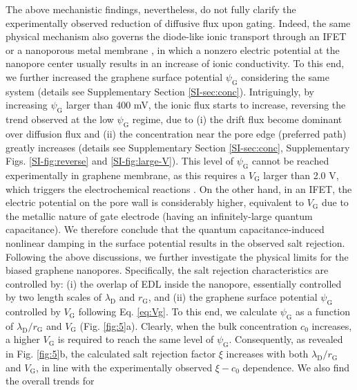 \documentclass[journal=nalefd,email=true, hyperref=true, keywords=false]{achemso}
\newcommand{\Fig}{Fig.}
\begin{document}
The above mechanistic findings, nevertheless, do not fully clarify the
experimentally observed reduction of diffusive flux upon
gating. Indeed, the same physical mechanism also governs 
the 
{ diode-like ionic
transport through an IFET  \cite{Nam_2009,Lee_2015,Feng_2016}
or a nanoporous metal membrane \cite{mccurry2017electrolyte}},
in which a nonzero electric potential at
the nanopore center usually results in an increase of ionic
conductivity. To this end, we
further increased the graphene surface potential $\psi_{\mathrm{G}}$
considering the same system (details see Supplementary Section
\ref{SI-sec:conc}). Intriguingly, by increasing
$\psi_{\mathrm{G}}$ larger than 400 mV, the ionic flux starts to
increase, reversing the trend observed at the low $\psi_{\mathrm{G}}$
regime, due to (i) the drift flux become dominant over diffusion flux
and (ii) the concentration near the pore edge (preferred path) greatly
increases (details see Supplementary Section \ref{SI-sec:conc},
Supplementary Figs. \ref{SI-fig:reverse} and
\ref{SI-fig:large-V}). This level of $\psi_{\mathrm{G}}$ cannot be
reached experimentally in graphene membrane, as this requires a
$V_{\mathrm{G}}$ larger than 2.0 V, which triggers the electrochemical
reactions \cite{Toh_2011}. On the other hand, in an IFET, the electric
potential on the pore wall is considerably higher, equivalent to
$V_{\mathrm{G}}$ due to the metallic nature of gate electrode (having
an infinitely-large quantum capacitance). We therefore conclude that
the quantum capacitance-induced nonlinear damping in the surface
potential results in the observed salt rejection.  Following the above
discussions, we further investigate the physical limits for the biased
graphene nanopores. Specifically, the salt rejection characteristics
are controlled by: (i) the overlap of EDL inside the nanopore,
essentially controlled by two length scales of $\lambda_{\mathrm{D}}$
and $r_{\mathrm{G}}$, and (ii) the graphene surface potential
$\psi_{\mathrm{G}}$ controlled by $V_{\mathrm{G}}$ following
Eq. \eqref{eq:Vg}. To this end, we calculate $\psi_{\mathrm{G}}$ as a
function of $\lambda_{\mathrm{D}} / r_{\mathrm{G}}$ and
$V_{\mathrm{G}}$ (\Fig{} \ref{fig:5}a). Clearly, when the bulk
concentration $c_{0}$ increases, a higher $V_{\mathrm{G}}$ is required
to reach the same level of $\psi_{\mathrm{G}}$. Consequently, as
revealed in \Fig{} \ref{fig:5}b, the calculated salt rejection factor
$\xi$ increases with both $\lambda_{\mathrm{D}} / r_{\mathrm{G}}$ and
$V_{\mathrm{G}}$, in line with the experimentally observed
$\xi - c_{0}$ dependence. We also find the overall trends for
\end{document}
